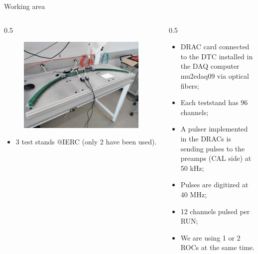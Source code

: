 \documentclass{beamer}[10pt]
\begin{document}
\begin{frame}{Working area}
    \begin{columns}
        \begin{column}{0.5\framewidth}
            \begin{figure}[H]
                \centering
                \includegraphics[width= \columnwidth]{figures/jpg/IMG_20240219_090538.jpg}
                \label{fig:enter-label}
            \end{figure}
\vspace{2mm}
            \begin{itemize}
            \item 3 test stands @IERC (only 2 have been used).
            \end{itemize}
        \end{column}
        \begin{column}{0.5\framewidth}
            \begin{itemize}
            \item DRAC card connected to the DTC installed in the DAQ computer mu2edaq09 via optical fibers;
\vspace{2mm}
            \item Each teststand has 96 channels;
\vspace{2mm}
            \item A pulser implemented in the DRACs is sending pulses to the preamps (CAL side) at 50 kHz;
\vspace{2mm}
            \item Pulses are digitized at 40 MHz;
\vspace{2mm}
            \item 12 channels pulsed per RUN;
\vspace{2mm}
            \item We are using 1 or 2 ROCs at the same time.
            \end{itemize}
        \end{column}
    \end{columns}
    \vspace{5mm}
\end{frame}
\end{document}
